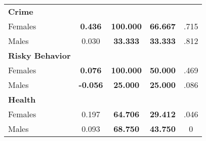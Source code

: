 \begin{tabular}{l c c c c}
\midrule
\textbf{Crime} & & & & \\
\quad Females &  \textbf{    0.436} & \textbf{  100.000} & \textbf{   66.667} & .715 \\
\quad Males &      0.030 & \textbf{   33.333} & \textbf{   33.333} & .812 \\
\midrule
\textbf{Risky Behavior} & & & & \\
\quad Females &  \textbf{    0.076} & \textbf{  100.000} & \textbf{   50.000} & .469 \\
\quad Males &  \textbf{   -0.056} & \textbf{   25.000} & \textbf{   25.000} & .086 \\
\midrule
\textbf{Health} & & & & \\
\quad Females &      0.197 & \textbf{   64.706} & \textbf{   29.412} & .046 \\
\quad Males &      0.093 & \textbf{   68.750} & \textbf{   43.750} & 0 \\
\bottomrule
\end{tabular}
